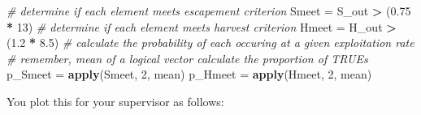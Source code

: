\documentclass[]{book}
\newenvironment{Shaded}{\begin{snugshade}}{\end{snugshade}}
\newcommand{\KeywordTok}[1]{\textcolor[rgb]{0.13,0.29,0.53}{\textbf{#1}}}
\newcommand{\DecValTok}[1]{\textcolor[rgb]{0.00,0.00,0.81}{#1}}
\newcommand{\FloatTok}[1]{\textcolor[rgb]{0.00,0.00,0.81}{#1}}
\newcommand{\StringTok}[1]{\textcolor[rgb]{0.31,0.60,0.02}{#1}}
\newcommand{\CommentTok}[1]{\textcolor[rgb]{0.56,0.35,0.01}{\textit{#1}}}
\newcommand{\OperatorTok}[1]{\textcolor[rgb]{0.81,0.36,0.00}{\textbf{#1}}}
\newcommand{\NormalTok}[1]{#1}
\theoremstyle{definition}
\theoremstyle{definition}
\theoremstyle{definition}
\theoremstyle{remark}
\begin{document}
\begin{Shaded}
\begin{Highlighting}[]
\CommentTok{# determine if each element meets escapement criterion}
\NormalTok{Smeet =}\StringTok{ }\NormalTok{S_out }\OperatorTok{>}\StringTok{ }\NormalTok{(}\FloatTok{0.75} \OperatorTok{*}\StringTok{ }\DecValTok{13}\NormalTok{)}
\CommentTok{# determine if each element meets harvest criterion}
\NormalTok{Hmeet =}\StringTok{ }\NormalTok{H_out }\OperatorTok{>}\StringTok{ }\NormalTok{(}\FloatTok{1.2} \OperatorTok{*}\StringTok{ }\FloatTok{8.5}\NormalTok{)}
\CommentTok{# calculate the probability of each occuring at a given exploitation rate}
  \CommentTok{# remember, mean of a logical vector calculate the proportion of TRUEs}
\NormalTok{p_Smeet =}\StringTok{ }\KeywordTok{apply}\NormalTok{(Smeet, }\DecValTok{2}\NormalTok{, mean)}
\NormalTok{p_Hmeet =}\StringTok{ }\KeywordTok{apply}\NormalTok{(Hmeet, }\DecValTok{2}\NormalTok{, mean)}
\end{Highlighting}
\end{Shaded}

You plot this for your supervisor as follows:
\end{document}
